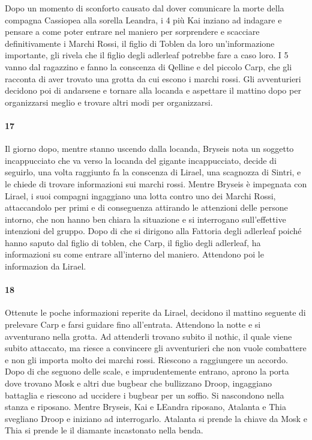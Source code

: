 \documentclass{article}
\begin{document}
    Dopo un momento di sconforto causato dal dover comunicare la morte della compagna Cassiopea alla sorella Leandra, i 4 più Kai inziano ad indagare e pensare a come poter entrare nel maniero per sorprendere e scacciare definitivamente i Marchi Rossi, il figlio di Toblen da loro un'informazione importante, gli rivela che il figlio degli adlerleaf potrebbe fare a caso loro. I 5 vanno dal ragazzino e fanno la conscenza di Qelline e del piccolo Carp, che gli racconta di aver trovato una grotta da cui escono i marchi rossi. Gli avventurieri decidono poi di andarsene e tornare alla locanda e aspettare il mattino dopo per organizzarsi meglio e trovare altri modi per organizzarsi. 
                      \paragraph{17}
     Il giorno dopo, mentre stanno uscendo dalla locanda, Bryseis nota un soggetto incappucciato che va verso la locanda del gigante incappucciato, decide di seguirlo, una volta raggiunto fa la conscenza di Lirael, una scagnozza di Sintri, e le chiede di trovare informazioni sui marchi rossi.
     Mentre Bryseis è impegnata con Lirael, i suoi compagni ingaggiano una lotta contro uno dei Marchi Rossi, attaccandolo per primi e di conseguenza attirando le attenzioni delle persone intorno, che non hanno ben chiara la situazione e si interrogano sull'effettive intenzioni del gruppo. 
     Dopo di che si dirigono alla Fattoria degli adlerleaf poiché hanno saputo dal figlio di toblen, che Carp, il figlio degli adlerleaf, ha informazioni su come entrare all'interno del maniero. 
    Attendono poi le informazion da Lirael.  
                      \paragraph{18}
    Ottenute le poche informazioni reperite da Lirael, decidono il mattino seguente di prelevare Carp e farsi guidare fino all'entrata. Attendono la notte e si avventurano nella grotta. Ad attenderli trovano subito il nothic, il quale viene subito attaccato, ma riesce a convincere gli avventurieri che non vuole combattere e non gli importa molto dei marchi rossi. Riescono a raggiungere un accordo. Dopo di che seguono delle scale, e imprudentemente entrano, aprono la porta dove trovano Mosk e altri due bugbear che bullizzano Droop, ingaggiano battaglia e riescono ad uccidere i bugbear per un soffio. Si nascondono nella stanza e riposano.  
    Mentre Bryseis, Kai e LEandra riposano, Atalanta e Thia svegliano Droop e iniziano ad interrogarlo. Atalanta si prende la chiave da Mosk e Thia si prende le il diamante incastonato nella benda.
\end{document}
